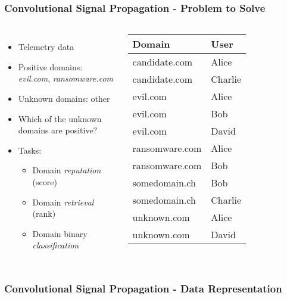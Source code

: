 \documentclass[aspectratio=169]{beamer}
\begin{document}
\begin{frame}
    \frametitle{Convolutional Signal Propagation - Problem to Solve}
    \begin{columns}    
    \begin{itemize}
        \item Telemetry data
        \item Positive domains: {\it{evil.com}}, {\it{ransomware.com}}
        \item Unknown domains: other
        \item<2-> \alert{Which of the unknown domains are positive?}
        \item<3-> Tasks:
        \begin{itemize}
            \item Domain \emph{reputation} (score)
            \item Domain \emph{retrieval} (rank)
            \item Domain binary \emph{classification}
        \end{itemize} 
    \end{itemize}
    \small
    \begin{tabular}{ll}
    \toprule
    Domain & User \\
    \midrule
    candidate.com & Alice \\
    candidate.com & Charlie \\
    evil.com & Alice \\
    evil.com & Bob \\
    evil.com & David \\
    ransomware.com & Alice \\
    ransomware.com & Bob \\
    somedomain.ch & Bob \\
    somedomain.ch & Charlie \\
    unknown.com & Alice \\
    unknown.com & David \\
    \bottomrule
    \end{tabular}    
    \end{columns}
\end{frame}


\begin{frame}
    \frametitle{Convolutional Signal Propagation - Data Representation}
    \scalebox{0.8}{
    
    }
\end{frame}
\end{document}
